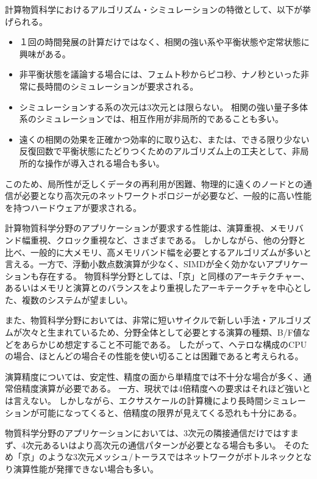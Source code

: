 計算物質科学におけるアルゴリズム・シミュレーションの特徴として、以下が挙げられる。

\begin{itemize}
\item １回の時間発展の計算だけではなく、相関の強い系や平衡状態や定常状態に興味がある。
\item 非平衡状態を議論する場合には、フェムト秒からピコ秒、ナノ秒といった非常に長時間のシミュレーションが要求される。
\item シミュレーションする系の次元は3次元とは限らない。
相関の強い量子多体系のシミュレーションでは、相互作用が非局所的であることも多い。
\item 遠くの相関の効果を正確かつ効率的に取り込む、または、できる限り少ない反復回数で平衡状態にたどりつくためのアルゴリズム上の工夫として、非局所的な操作が導入される場合も多い。
\end{itemize}

このため、局所性が乏しくデータの再利用が困難、物理的に遠くのノードとの通信が必要となり高次元のネットワークトポロジーが必要など、一般的に高い性能を持つハードウェアが要求される。

計算物質科学分野のアプリケーションが要求する性能は、演算重視、メモリバンド幅重視、クロック重視など、さまざまである。
しかしながら、他の分野と比べ、一般的に大メモリ、高メモリバンド幅を必要とするアルゴリズムが多いと言える。一方で、浮動小数点数演算が少なく、SIMDが全く効かないアプリケーションも存在する。
物質科学分野としては、「京」と同様のアーキテクチャー、あるいはメモリと演算とのバランスをより重視したアーキテークチャを中心とした、複数のシステムが望ましい。

また、物質科学分野においては、非常に短いサイクルで新しい手法・アルゴリズムが次々と生まれているため、分野全体として必要とする演算の種類、B/F値などをあらかじめ想定すること不可能である。
したがって、ヘテロな構成のCPUの場合、ほとんどの場合その性能を使い切ることは困難であると考えられる。

演算精度については、安定性、精度の面から単精度では不十分な場合が多く、通常倍精度演算が必要である。
一方、現状では4倍精度への要求はそれほど強いとは言えない。
しかしながら、エクサスケールの計算機により長時間シミュレーションが可能になってくると、倍精度の限界が見えてくる恐れも十分にある。

物質科学分野のアプリケーションにおいては、3次元の隣接通信だけではすまず、4次元あるいはより高次元の通信パターンが必要となる場合も多い。
そのため「京」のような3次元メッシュ/トーラスではネットワークがボトルネックとなり演算性能が発揮できない場合も多い。

